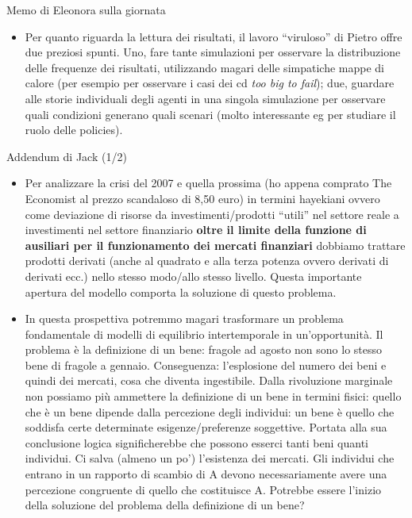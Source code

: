 \documentclass[9pt]{beamer}
\begin{document}
\begin{frame}{Memo di Eleonora sulla giornata}
\begin{itemize}
\item
Per quanto riguarda la lettura dei risultati, il lavoro ``viruloso'' di Pietro offre due preziosi spunti. Uno, fare tante simulazioni per osservare la distribuzione delle frequenze dei risultati, utilizzando magari  delle simpatiche mappe di calore (per esempio per osservare i casi dei cd \emph{too big to fail}); due, guardare alle storie individuali degli agenti in una singola simulazione per osservare quali condizioni generano quali scenari (molto interessante eg per studiare il ruolo delle policies).

\end{itemize}

\end{frame}


\begin{frame}{Addendum di Jack (1/2)}

\scriptsize

\begin{itemize}

\item
Per analizzare la crisi del 2007 e quella prossima (ho appena comprato The Economist al prezzo scandaloso di 8,50 euro) in termini hayekiani ovvero come deviazione di risorse da investimenti/prodotti ``utili'' nel settore reale a investimenti nel settore finanziario \textbf{oltre il limite della funzione di ausiliari per il funzionamento dei mercati finanziari} dobbiamo trattare prodotti derivati (anche al quadrato e alla terza potenza ovvero derivati di derivati ecc.) nello stesso modo/allo stesso livello. Questa importante apertura del modello comporta la soluzione di questo problema.

\item
In questa prospettiva potremmo magari trasformare un problema fondamentale di modelli di equilibrio intertemporale in un'opportunit\`{a}. Il problema \`{e} la definizione di un bene: fragole ad agosto non sono lo stesso bene di fragole a gennaio. Conseguenza: l'esplosione del numero dei beni e quindi dei mercati, cosa che diventa ingestibile. Dalla rivoluzione marginale non possiamo pi\`{u} ammettere la definizione di un bene in termini fisici: quello che \`{e} un bene dipende dalla percezione degli individui: un bene \`{e} quello che soddisfa certe determinate esigenze/preferenze soggettive. Portata alla sua conclusione logica significherebbe che possono esserci tanti beni quanti individui. Ci salva (almeno un po') l'esistenza dei mercati. Gli individui che entrano in un rapporto di scambio di A devono necessariamente avere una percezione congruente di quello che costituisce A. Potrebbe essere l'inizio della soluzione del problema della definizione di un bene?


\end{itemize}

\end{frame}
\end{document}
